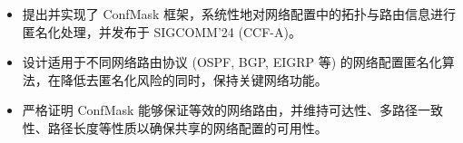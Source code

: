 


\begin{itemize}[nosep]
  \item 提出并实现了 ConfMask 框架，系统性地对网络配置中的拓扑与路由信息进行匿名化处理，并发布于 SIGCOMM'24 (CCF-A)。
  \item 设计适用于不同网络路由协议 (OSPF, BGP, EIGRP 等) 的网络配置匿名化算法，在降低去匿名化风险的同时，保持关键网络功能。
  \item 严格证明 ConfMask 能够保证等效的网络路由，并维持可达性、多路径一致性、路径长度等性质以确保共享的网络配置的可用性。
\end{itemize}
